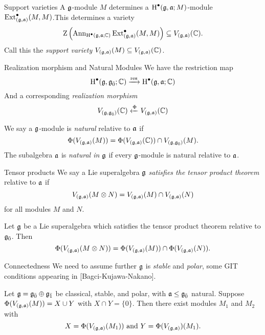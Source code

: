 \documentclass{beamer}
\begin{document}
\begin{frame}{Support varieties}\pause
  A $\mathfrak{g}$-module $M$ determines a $\operatorname{H}^\bullet(\mathfrak{g},\mathfrak{a};M)$-module $\operatorname{Ext}^\bullet_{(\mathfrak{g},\mathfrak{a})}(M,M)$.\pause This determines a variety
  \[
    \operatorname{Z}\left(\operatorname{Ann}_{\operatorname{H}^\bullet(\mathfrak{g},\mathfrak{a};\mathbb{C})}\operatorname{Ext}^\bullet_{(\mathfrak{g},\mathfrak{a})}(M,M)\right) \subseteq V_{(\mathfrak{g},\mathfrak{a})}(\mathbb{C}).
  \]\pause
  Call this the \emph{support variety} $V_{(\mathfrak{g},\mathfrak{a})}(M) \subseteq V_{(\mathfrak{g},\mathfrak{a})}(\mathbb{C})$.
\end{frame}

\begin{frame}{Realization morphism and Natural Modules}\pause
  We have the restriction map
  \[
    \operatorname{H}^\bullet(\mathfrak{g},{\mathfrak{g}}_{\bar{0}};\mathbb{C}) \xrightarrow{\operatorname{res}} \operatorname{H}^\bullet(\mathfrak{g},\mathfrak{a};\mathbb{C})
  \]\pause
  And a corresponding \emph{realization morphism}
  \[
    V_{(\mathfrak{g},{\mathfrak{g}}_{\bar{0}})}(\mathbb{C}) \xleftarrow{\Phi} V_{(\mathfrak{g},\mathfrak{a})}(\mathbb{C})
  \]
\pause
  \begin{definition}
    We say a $\mathfrak{g}$-module is \emph{natural} relative to $\mathfrak{a}$ if
    \[
      \Phi(V_{(\mathfrak{g},\mathfrak{a})}(M)) = \Phi(V_{(\mathfrak{g},\mathfrak{a})}(\mathbb{C})) \cap V_{(\mathfrak{g},{\mathfrak{g}}_{\bar{0}})}(M).
    \]
    The subalgebra $\mathfrak{a}$ is \emph{natural in $\mathfrak{g}$} if every $\mathfrak{g}$-module is natural relative to $\mathfrak{a}$.
  \end{definition}
  
\end{frame}

\begin{frame}{Tensor products}\pause
  We say a Lie superalgebra $\mathfrak{g}$ \emph{satisfies the tensor product theorem} relative to $\mathfrak{a}$ if
  \[
    V_{(\mathfrak{g},\mathfrak{a})}(M \otimes N) = V_{(\mathfrak{g},\mathfrak{a})}(M) \cap V_{(\mathfrak{g},\mathfrak{a})}(N)
  \]
  for all modules $M$ and $N$.
  \pause
  \begin{theorem}
    Let $\mathfrak{g}$ be a Lie superalgebra which satisfies the tensor product theorem relative to ${\mathfrak{g}}_{\bar{0}}$. Then \[\Phi(V_{(\mathfrak{g},\mathfrak{a})}(M \otimes N)) = \Phi(V_{(\mathfrak{g},\mathfrak{a})}(M)) \cap \Phi(V_{(\mathfrak{g},\mathfrak{a})}(N)).\]
  \end{theorem}
\end{frame}

\begin{frame}{Connectedness} \pause
  We need to assume further $\mathfrak{g}$ is \emph{stable} and \emph{polar}, some GIT conditions appearing in [Bagci-Kujawa-Nakano].

  \pause
  \begin{theorem}
    Let $\mathfrak{g} = {\mathfrak{g}}_{\bar{0}} \oplus {\mathfrak{g}}_{\bar{1}}$ be classical, stable, and polar, with $\mathfrak{a} \leq {\mathfrak{g}}_{\bar{0}}$ natural. Suppose $\Phi(V_{(\mathfrak{g},\mathfrak{a})}(M)) = X \cup Y$ with $X \cap Y = \{0\}$. Then there exist modules $M_1$ and $M_2$ with
    \[
      X = \Phi(V_{(\mathfrak{g},\mathfrak{a})}(M_1)) \text{ and } Y = \Phi(V_{(\mathfrak{g},\mathfrak{a})})(M_1).
    \]
    
  \end{theorem}
\end{frame}
\end{document}
